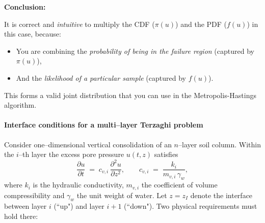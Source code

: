 \textbf{Conclusion:}

It is correct and \textit{intuitive} to multiply the CDF ($\pi(u)$) and the PDF ($f(u)$) in this case, because:
\begin{itemize}
    \item You are combining the \textit{probability of being in the failure region} (captured by $\pi(u)$),
    \item And the \textit{likelihood of a particular sample} (captured by $f(u)$).
\end{itemize}

This forms a valid joint distribution that you can use in the Metropolis-Hastings algorithm.





\paragraph{Interface conditions for a multi--layer Terzaghi problem}
Consider one--dimensional vertical consolidation of an $n$--layer soil column.
Within the $i$--th layer the excess pore pressure $u(t,z)$ satisfies
\begin{equation}
  \frac{\partial u}{\partial t}
  \;=\;
  c_{v,i}\,
  \frac{\partial^{2}u}{\partial z^{2}},
  \qquad
  c_{v,i}
  \;=\;
  \frac{k_i}{m_{v,i}\,\gamma_w},
  \label{eq:terzaghi_dim}
\end{equation}
where $k_i$ is the hydraulic conductivity, $m_{v,i}$ the coefficient of
volume compressibility and $\gamma_w$ the unit weight of water.
Let $z=z_I$ denote the interface between layer $i$ (``up") and layer $i{+}1$
(``down").  Two physical requirements must hold there:

